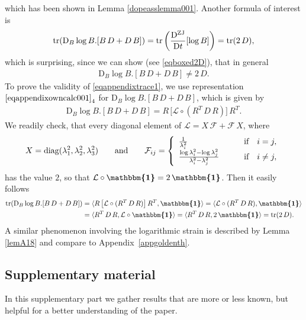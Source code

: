 \documentclass[10pt]{article}
\numberwithin{theoremCounter}{section}
\theoremstyle{plain}
\theoremstyle{definition}
\newcommand{\id}{{\boldsymbol{\mathbbm{1}}}}
\newcommand{\DD}{\mathrm{D}}
\DeclareMathOperator{\diag}{diag}
\DeclareMathOperator{\tr}{tr}
\DeclareMathOperator{\ZJ}{ZJ}
\def\tr{\textnormal{tr}}
\numberwithin{equation}{section}
\begin{document}
\begin{appendix}
which has been shown in Lemma \ref{dopeasslemma001}.  Another formula of interest is
	\begin{align}
	\label{eqappendixtrace1}
	\tr(\DD_B \log B . [B \, D + D \, B]) = \tr\left(\frac{\DD^{\ZJ}}{\DD t}[\log B]\right) = \tr(2 \, D),
	\end{align}
which is surprising, since we can show (see \eqref{eqboxed2D}), that in general
	\begin{align}
	\DD_B \log B . [B \, D + D \, B] \neq 2 \, D.
	\end{align}
To prove the validity of \eqref{eqappendixtrace1}, we use representation $\eqref{eqappendixowncalc001}_4$ for $\DD_B \log B . [B \, D + D \, B]$, which is given by
	\begin{align}
	\DD_B \log B . [B \, D + D \, B] = R \, \big[ \mathcal{L} \circ (R^T \, D \, R) \big] \, R^T.
	\end{align}
We readily check, that every diagonal element of $\mathcal{L} = X \, \mathcal{F} + \mathcal{F} \, X$, where
	\begin{align}
	X = \diag(\lambda_1^2, \lambda_2^2, \lambda_3^2) \qquad \textnormal{and} \qquad \mathcal{F}_{ij} =
		\left\{
		\begin{array}{ll}
		\frac{1}{\lambda_i^2} &\qquad \textnormal{if} \quad i = j, \\
		\frac{\log \lambda_i^2 - \log \lambda_j^2}{\lambda_i^2 - \lambda_j^2} &\qquad \textnormal{if} \quad i \neq j,
		\end{array}
		\right.
	\end{align}
has the value $2$, so that $\mathcal{L} \circ \id = 2 \, \id$. Then it easily follows
	\begin{equation}
	\begin{alignedat}{2}
	\tr(\DD_B \log B . [B \, D + D \, B]) &= \langle R \, \big[ \mathcal{L} \circ (R^T \, D \, R) \big] \, R^T, \id \rangle = \langle \mathcal{L} \circ (R^T \, D \, R) , \id \rangle \\
	&= \langle R^T \, D \, R , \mathcal{L} \circ \id \rangle = \langle R^T \, D \, R , 2 \, \id \rangle = \tr(2 \, D).
	\end{alignedat}
	\end{equation}
%
A similar phenomenon involving the logarithmic strain is described by Lemma \ref{lemA18} and compare to Appendix~\ref{appgoldenth}.
%
\footnotesize
%
\subsection{Supplementary material}
%
In this supplementary part we gather results that are more or less known, but helpful for a better understanding of the paper.
%

\end{appendix}
\end{document}
